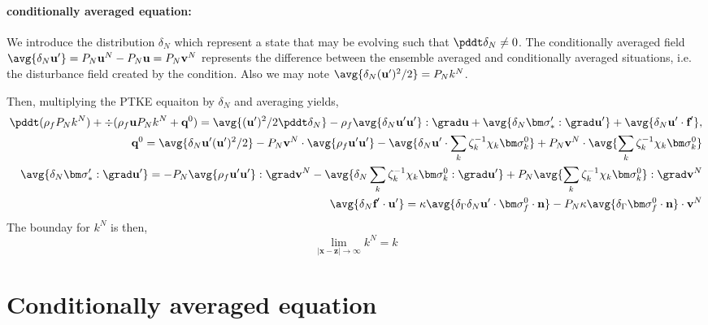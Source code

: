 \paragraph{conditionally averaged equation: }
We introduce the distribution $\delta_N$ which represent a state that may be evolving such that $\pddt \delta_N \neq 0$. 
The conditionally averaged field $\avg{\delta_N \textbf{u}'} = P_N \textbf{u}^N - P_N \textbf{u}= P_N \textbf{v}^N$ represents the difference between the ensemble averaged and conditionally averaged situations, i.e. the disturbance field created by the condition. 
Also we may note $\avg{\delta_N (\textbf{u}')^2/2} = P_N k^N$. 

Then, multiplying the PTKE equaiton by $\delta_N$ and averaging yields, 
\begin{align*}
    \pddt(\rho_f P_N k^N )
    + \div (
        \rho_f \textbf{u} P_N k^N 
        + \textbf{q}^0
        )
    =
    \avg{(\textbf{u}')^2/2\pddt \delta_N }
    - \rho_f \avg{\delta_N \textbf{u}'\textbf{u}'}:\grad \textbf{u}
    + \avg{\delta_N\bm\sigma_*' : \grad \textbf{u}'} 
    + \avg{\delta_N \textbf{u}'\cdot \textbf{f}'},\\
    \textbf{q}^0 =
    \avg{\delta_N \textbf{u}' (\textbf{u}')^2/2}
    -P_N \textbf{v}^N \cdot  \avg{\rho_f \textbf{u}' \textbf{u}'}
    - \avg{\delta_N \textbf{u}' \cdot \sum_k \zeta^{-1}_k \chi_k \bm\sigma_k^0}
    + P_N \textbf{v}^N  \cdot  \avg{\sum_k \zeta^{-1}_k \chi_k \bm\sigma_k^0  }\\
    \avg{\delta_N \bm\sigma_*': \grad \textbf{u}'}
    =
    -P_N \avg{\rho_f \textbf{u}' \textbf{u}'}:\grad \textbf{v}^N 
    - \avg{\delta_N \sum_k \zeta^{-1}_k \chi_k \bm\sigma_k^0  :\grad \textbf{u}'}
    +P_N  \avg{\sum_k \zeta^{-1}_k \chi_k \bm\sigma_k^0  }:\grad \textbf{v}^N\\
    \avg{\delta_N \textbf{f}' \cdot \textbf{u}'}
    =
    \kappa \avg{\delta_\Gamma\delta_N  \textbf{u}'\cdot \bm\sigma_f^0 \cdot \textbf{n} }
    - P_N  \kappa \avg{\delta_\Gamma \bm\sigma_f^0 \cdot \textbf{n}}
      \cdot \textbf{v}^N
    \\
\end{align*}
The bounday for $k^N$ is then, 
\begin{equation}
    \lim_{|\textbf{x}- \textbf{z}| \to \infty} k^N = k
\end{equation}
\section{Conditionally averaged equation}


